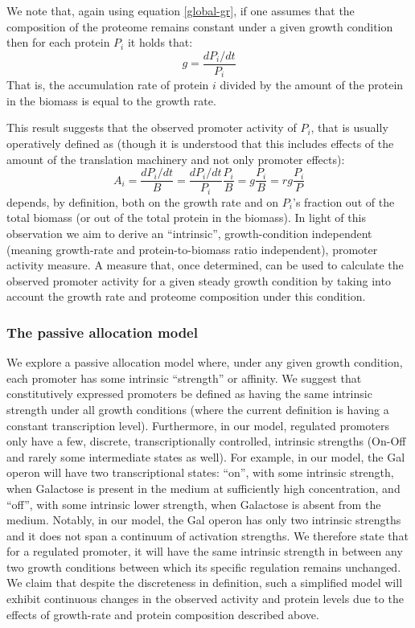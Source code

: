 \documentclass[a4page,notitlepage]{article}
\begin{document}
We note that, again using equation \ref{global-gr}, if one assumes that the composition of the proteome remains constant under a given growth condition then for each protein $P_i$ it holds that:
\[g=\frac{dP_i/dt}{P_i}\]
That is, the accumulation rate of protein $i$ divided by the amount of the protein in the biomass is equal to the growth rate.

This result suggests that the observed promoter activity of $P_i$, that is usually operatively defined as (though it is understood that this includes effects of the amount of the translation machinery and not only promoter effects):
\begin{equation}
\label{pa-gr-relation}
A_i=\frac{dP_i/dt}{B}=\frac{dP_i/dt}{P_i}\frac{P_i}{B}=g\frac{P_i}{B}=rg\frac{P_i}{P}
\end{equation}
depends, by definition, both on the growth rate and on $P_i$'s fraction out of the total biomass (or out of the total protein in the biomass).
In light of this observation we aim to derive an “intrinsic”, growth-condition independent (meaning growth-rate and protein-to-biomass ratio independent), promoter activity measure.
A measure that, once determined, can be used to calculate the observed promoter activity for a given steady growth condition by taking into account the growth rate and proteome composition under this condition.
\subsubsection{The passive allocation model}
We explore a passive allocation model where, under any given growth condition, each promoter has some intrinsic ``strength'' or affinity.
We suggest that constitutively expressed promoters be defined as having the same intrinsic strength under all growth conditions (where the current definition is having a constant transcription level).
Furthermore, in our model, regulated promoters only have a few, discrete, transcriptionally controlled, intrinsic strengths (On-Off and rarely some intermediate states as well).
For example, in our model, the Gal operon will have two transcriptional states: ``on'', with some intrinsic strength, when Galactose is present in the medium at sufficiently high concentration, and ``off'', with some intrinsic lower strength, when Galactose is absent from the medium.
Notably, in our model, the Gal operon has only two intrinsic strengths and it does not span a continuum of activation strengths.
We therefore state that for a regulated promoter, it will have the same intrinsic strength in between any two growth conditions between which its specific regulation remains unchanged.
We claim that despite the discreteness in definition, such a simplified model will exhibit continuous changes in the observed activity and protein levels due to the effects of growth-rate and protein composition described above.
\end{document}
